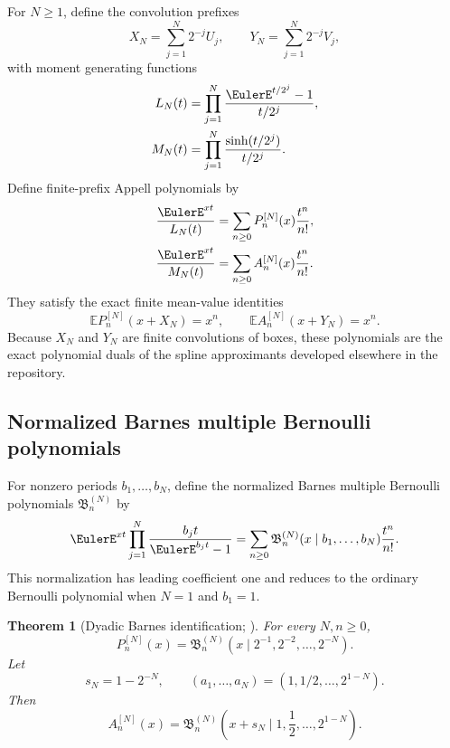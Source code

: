 \documentclass[11pt,oneside]{article}
\numberwithin{equation}{section}
\newtheorem{theorem}{Theorem}[section]
\theoremstyle{definition}
\theoremstyle{remark}
\begin{document}
For $N\ge1$, define the convolution prefixes
\begin{equation}
 X_N=\sum_{j=1}^{N}2^{-j}U_j,
 \qquad
 Y_N=\sum_{j=1}^{N}2^{-j}V_j,
 \label{p2:eq:finite-XY}
\end{equation}
with moment generating functions
\begin{align}
 L_N(t)&=\prod_{j=1}^{N}\frac{\EulerE^{t/2^j}-1}{t/2^j},
 \label{p2:eq:LN}\\
 M_N(t)&=\prod_{j=1}^{N}\frac{\sinh(t/2^j)}{t/2^j}.
 \label{p2:eq:MN}
\end{align}
Define finite-prefix Appell polynomials by
\begin{align}
 \frac{\EulerE^{xt}}{L_N(t)}
 &=\sum_{n\ge0}P_n^{[N]}(x)\frac{t^n}{n!},
 \label{p2:eq:PN-generating}\\
 \frac{\EulerE^{xt}}{M_N(t)}
 &=\sum_{n\ge0}A_n^{[N]}(x)\frac{t^n}{n!}.
 \label{p2:eq:AN-generating}
\end{align}
They satisfy the exact finite mean-value identities
\begin{equation}
 \mathbb E P_n^{[N]}(x+X_N)=x^n,
 \qquad
 \mathbb E A_n^{[N]}(x+Y_N)=x^n.
 \label{p2:eq:finite-mean-value}
\end{equation}
Because $X_N$ and $Y_N$ are finite convolutions of boxes, these polynomials are the exact
polynomial duals of the spline approximants developed elsewhere in the repository.

\subsection{Normalized Barnes multiple Bernoulli polynomials}

For nonzero periods $b_1,\ldots,b_N$, define the normalized Barnes multiple Bernoulli polynomials
$\mathfrak B_n^{(N)}$ by
\begin{equation}
 \EulerE^{xt}\prod_{j=1}^{N}\frac{b_jt}{\EulerE^{b_jt}-1}
 =\sum_{n\ge0}
 \mathfrak B_n^{(N)}(x\mid b_1,\ldots,b_N)\frac{t^n}{n!}.
 \label{p2:eq:Barnes-def}
\end{equation}
This normalization has leading coefficient one and reduces to the ordinary Bernoulli polynomial
when $N=1$ and $b_1=1$.

\begin{theorem}[Dyadic Barnes identification; \statusnew]
\label{p2:thm:Barnes-identification}
For every $N,n\ge0$,
\begin{equation}
 \boxed{
 P_n^{[N]}(x)
 =\mathfrak B_n^{(N)}
 \left(x\mid 2^{-1},2^{-2},\ldots,2^{-N}\right).
 }
 \label{p2:eq:P-Barnes}
\end{equation}
Let
\begin{equation}
 s_N=1-2^{-N},
 \qquad
 (a_1,\ldots,a_N)=(1,1/2,\ldots,2^{1-N}).
 \label{p2:eq:a-sN}
\end{equation}
Then
\begin{equation}
 \boxed{
 A_n^{[N]}(x)
 =\mathfrak B_n^{(N)}
 \left(x+s_N\mid1,\frac12,\ldots,2^{1-N}\right).
 }
 \label{p2:eq:A-Barnes}
\end{equation}
\end{theorem}
\end{document}
